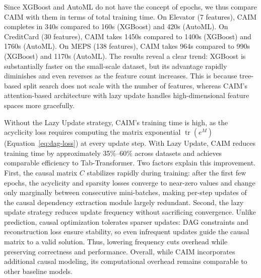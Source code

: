 \documentclass[sigconf, nonacm]{acmart}
\newcommand{\syfix}[1]{{\color{black}#1}}
\newcommand{\syne}[1]{{\color{black}#1}}
\newcommand*{\ourmodel}{CAIM}
\begin{document}
\syfix{
Since XGBoost and AutoML do not have the concept of epochs, we thus compare \ourmodel{} with them in terms of total training time. 
On Elevator (7 features), \ourmodel{} completes in 340s compared to 160s (XGBoost) and 420s (AutoML). On CreditCard (30 features), \ourmodel{} takes 1450s compared to 1400s (XGBoost) and 1760s (AutoML). On MEPS (138 features), \ourmodel{} takes 964s compared to 990s (XGBoost) and 1170s (AutoML). The results reveal a clear trend: XGBoost is substantially faster on the small-scale dataset, but its advantage rapidly diminishes and even reverses as the feature count increases. 
This is because tree-based split search does not scale with the number of features\cite{r:xgboost}, whereas \ourmodel{}'s attention-based architecture with lazy update handles high-dimensional feature spaces more gracefully.
}

\syfix{Without the Lazy Update strategy, \ourmodel{}'s training time is high, as the acyclicity loss requires computing the matrix exponential $\operatorname{tr}(e^M)$ (Equation~\ref{eq:dag-loss}) at every update step. 
With Lazy Update, \ourmodel{} reduces training time by approximately 35\%--60\% across datasets and achieves comparable efficiency to Tab-Transformer. }
\syne{Two factors explain this improvement. First, the causal matrix $C$ stabilizes rapidly during training: after the first few epochs, the acyclicity and sparsity losses converge to near-zero values and change only marginally between consecutive mini-batches, making per-step updates of the causal dependency extraction module largely redundant.}
\syne{Second, the lazy update strategy reduces update frequency without sacrificing convergence. Unlike prediction, causal optimization tolerates sparser updates: DAG constraints and reconstruction loss ensure stability, so even infrequent updates guide the causal matrix to a valid solution. Thus, lowering frequency cuts overhead while preserving correctness and performance.}
\syfix{Overall, while \ourmodel{} incorporates additional causal modeling, its computational overhead remains comparable to other baseline models.}

\end{document}
